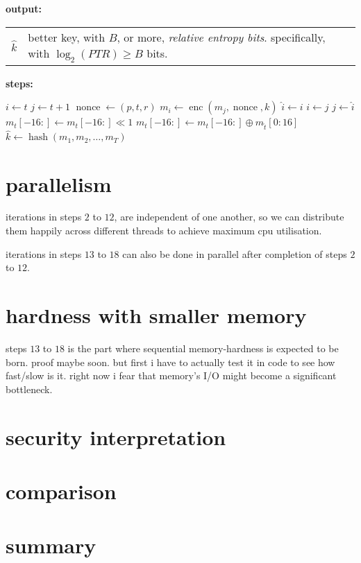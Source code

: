 \documentclass{article}
\DeclareMathOperator{\enc}{enc}
\DeclareMathOperator{\nonce}{nonce}
\DeclareMathOperator{\hash}{hash}
\begin{document}
\begin{multicols}{2}
\noindent\textbf{output:}

\begin{tabular}{lp{18em}}
$\hat k$ & better key, with $B$, or more, \emph{relative entropy bits}.
specifically, with $\log_2(PTR) \ge B$ bits.\\
\end{tabular}

\noindent\textbf{steps:}

\begin{algorithmic}[1]
            \STATE $i \gets t$
            \STATE $j \gets t+1$
                \STATE $\nonce \gets (p, t, r)$
                \STATE $m_i \gets \enc(m_j, \nonce, k)$
                \STATE $\hat i \gets i$
                \STATE $i \gets j$
                \STATE $j \gets \hat i$
            \ENDFOR
        \ENDFOR
                \STATE $m_t[-16:] \gets m_t[-16:] \ll 1$
                \STATE $m_t[-16:] \gets m_t[-16:] \oplus m_{\hat t}[0:16]$
            \ENDFOR
        \ENDFOR
    \ENDFOR
    \RETURN $\hat k \gets \hash(m_1, m_2, \ldots, m_T)$
\end{algorithmic}
\vfill\null
\columnbreak

\section{parallelism}
iterations in steps $2$ to $12$, are independent of one another, so we can
distribute them happily across different threads to achieve maximum cpu
utilisation.

iterations in steps $13$ to $18$ can also be done in parallel after
completion of steps $2$ to $12$.

\section{hardness with smaller memory}
steps $13$ to $18$ is the part where sequential memory-hardness is expected
to be born.  proof maybe soon.  but first i have to actually test it in
code to see how fast/slow is it.  right now i fear that memory's I/O might
become a significant bottleneck.
\vfill\null
\columnbreak

\section{security interpretation}
\section{comparison}
\section{summary}

\end{multicols}
\end{document}

